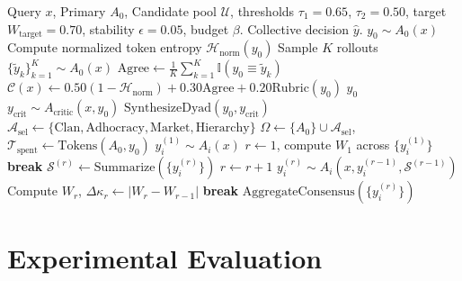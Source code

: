 \documentclass[conference]{IEEEtran}
\begin{document}
\begin{algorithm}[t]
\caption{Confidence-Gated Selective Consultation Protocol}
\label{alg:cgsc}
\begin{algorithmic}[1]
\REQUIRE Query $x$, Primary $A_0$, Candidate pool $\mathcal{U}$, thresholds $\tau_1=0.65$, $\tau_2=0.50$, target $W_{\text{target}}=0.70$, stability $\epsilon=0.05$, budget $\beta$.
\ENSURE Collective decision $\hat{y}$.
\STATE $y_0 \sim A_0(x)$
\STATE Compute normalized token entropy $\mathcal{H}_{\text{norm}}(y_0)$
\STATE Sample $K$ rollouts $\{\tilde{y}_k\}_{k=1}^K \sim A_0(x)$
\STATE $\text{Agree} \leftarrow \frac{1}{K} \sum_{k=1}^K \mathbb{I}(y_0 \equiv \tilde{y}_k)$
\STATE $\mathcal{C}(x) \leftarrow 0.50 (1 - \mathcal{H}_{\text{norm}}) + 0.30 \text{Agree} + 0.20 \text{Rubric}(y_0)$
    \RETURN $y_0$ 
    \STATE $y_{\text{crit}} \sim A_{\text{critic}}(x, y_0)$
    \RETURN $\text{SynthesizeDyad}(y_0, y_{\text{crit}})$ 
\ENDIF
\STATE $\mathcal{A}_{\text{sel}} \leftarrow \{\text{Clan}, \text{Adhocracy}, \text{Market}, \text{Hierarchy}\}$
\STATE $\Omega \leftarrow \{A_0\} \cup \mathcal{A}_{\text{sel}}$, $\mathcal{T}_{\text{spent}} \leftarrow \text{Tokens}(A_0, y_0)$
    \STATE $y_i^{(1)} \sim A_i(x)$
\ENDFOR
\STATE $r \leftarrow 1$, compute $W_1$ across $\{y_i^{(1)}\}$
        \STATE \textbf{break}
    \ENDIF
    \STATE $\mathcal{S}^{(r)} \leftarrow \text{Summarize}(\{y_i^{(r)}\})$
    \STATE $r \leftarrow r + 1$
        \STATE $y_i^{(r)} \sim A_i(x, y_i^{(r-1)}, \mathcal{S}^{(r-1)})$
    \ENDFOR
    \STATE Compute $W_r$, $\Delta \kappa_r \leftarrow |W_r - W_{r-1}|$
        \STATE \textbf{break}
    \ENDIF
\ENDWHILE
\RETURN $\text{AggregateConsensus}(\{y_i^{(r)}\})$
\end{algorithmic}
\end{algorithm}

\section{Experimental Evaluation}
\end{document}

